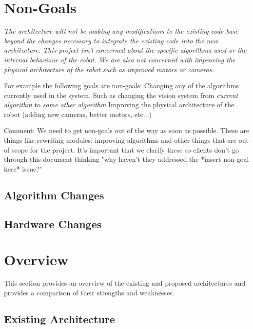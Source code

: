 \documentclass[english,12pt]{scrartcl}
\begin{document}
	\section{Non-Goals}
		{
		\em %
		The architecture will not be making any modifications to the existing code base beyond the
		changes necessary to integrate the existing code into the new architecture. This project
		isn't concerned about the specific algorithms used or the internal behaviour of the robot.
		We are also not concerned with improving the physical architecture of the robot such as
		improved motors or cameras.

		For example the following goals are non-goals:
		Changing any of the algorithms currently used in the system. Such as changing the vision
		system from \emph{current algorithm} to \emph{some other algorithm} Improving the physical
		architecture of the robot (adding new cameras, better motors, etc...)

		Comment: We need to get non-goals out of the way as soon as possible. These are things like
		rewriting modules, improving algorithms and other things that are out of scope for the
		project. It's important that we clarify these so clients don't go through this document
		thinking "why haven't they addressed the *insert non-goal here* issue?"
		}

		\subsection{Algorithm Changes}

		\subsection{Hardware Changes}

	\section{Overview}
		This section provides an overview of the existing and proposed architectures and provides a comparison
		of their strengths and weaknesses.

		\subsection{Existing Architecture}
\end{document}

